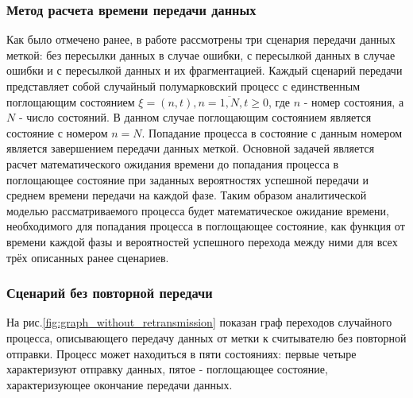 \documentclass[12pt]{article}
\theoremstyle{definition}
\begin{document}


\subsubsection{Метод расчета времени передачи данных}

Как было отмечено ранее, в работе рассмотрены три сценария передачи данных меткой: без пересылки данных в случае ошибки, с пересылкой данных в случае ошибки и с пересылкой данных и их фрагментацией. Каждый сценарий передачи представляет собой случайный полумарковский процесс с единственным поглощающим состоянием $\xi=(n,t), n=\overline{1,N}, t \ge 0$, где $n$ - номер состояния, а $N$ - число состояний. В данном случае поглощающим состоянием является состояние с номером $n=N$. Попадание процесса в состояние с данным номером является завершением передачи данных меткой. Основной задачей является расчет математического ожидания времени до попадания процесса в поглощающее состояние при заданных вероятностях успешной передачи и среднем времени передачи на каждой фазе. Таким образом аналитической моделью рассматриваемого процесса будет математическое ожидание времени, необходимого для попадания процесса в поглощающее состояние, как функция от времени каждой фазы и вероятностей успешного перехода между ними для всех трёх описанных ранее сценариев.

\subsubsection{Сценарий без повторной передачи}

На рис.\ref{fig:graph_without_retransmission} показан граф переходов случайного процесса, описывающего передачу данных от метки к считывателю без повторной отправки. Процесс может находиться в пяти состояниях: первые четыре характеризуют отправку данных, пятое - поглощающее состояние, характеризующее окончание передачи данных. 
\end{document}
